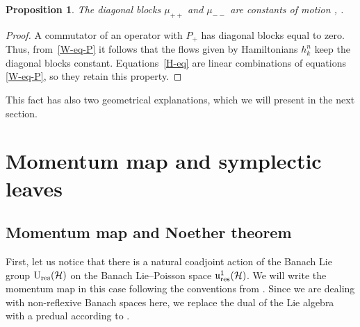 \documentclass[pdftex]{sigma}
\newtheorem{prop}[thm]{Proposition}
\theoremstyle{definition}
\numberwithin{equation}{section}
\renewcommand{\H}{\mathcal{H}}
\newcommand{\Ur}{\mathrm{U}_{\textnormal{res}}(\H)}
\newcommand{\urp}{\mathfrak u_{\textnormal{res}}^1(\H)}
\begin{document}
\begin{prop}\label{prop:diag-const}
The diagonal blocks $\mu_{++}$ and $\mu_{--}$ are constants of motion
, .
\end{prop}
\begin{proof}
A commutator of an operator with $P_+$ has diagonal blocks equal to zero. Thus, from~\eqref{W-eq-P} it follows that the flows given by Hamiltonians $h^n_k$ keep the diagonal blocks constant.
Equations~\eqref{H-eq} are linear combinations of equations \eqref{W-eq-P}, so they retain this property.
\end{proof}

This fact has also two geometrical explanations, which we will present in the next section.

\section{Momentum map and symplectic leaves}\label{sec:momentum}

\subsection{Momentum map and Noether theorem}
First, let us notice that there is a natural coadjoint action of the Banach Lie group $\Ur$ on the Banach Lie--Poisson space $\urp$. We will write the momentum map in this case following the conventions from \cite[Definition 11.2.1]{ratiu-ms}. Since we are dealing with non-reflexive Banach spaces here, we replace the dual of the Lie algebra with a predual according to \cite[Definition~8.1]{OR}.
\end{document}
